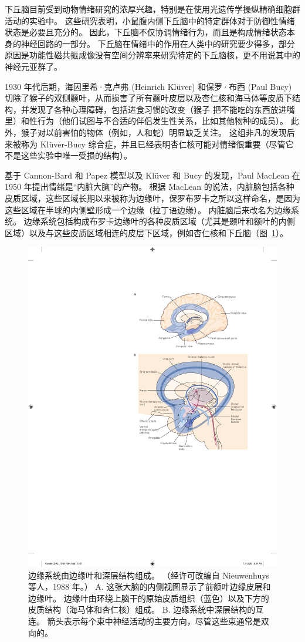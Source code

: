 下丘脑目前受到动物情绪研究的浓厚兴趣，特别是在使用光遗传学操纵精确细胞群活动的实验中。
这些研究表明，小鼠腹内侧下丘脑中的特定群体对于防御性情绪状态是必要且充分的。
因此，下丘脑不仅协调情绪行为，而且是构成情绪状态本身的神经回路的一部分。
下丘脑在情绪中的作用在人类中的研究要少得多，部分原因是功能性磁共振成像没有空间分辨率来研究特定的下丘脑核，更不用说其中的神经元亚群了。


1930 年代后期，海因里希·克卢弗 (Heinrich Klüver) 和保罗·布西 (Paul Bucy) 切除了猴子的双侧颞叶，从而损害了所有颞叶皮层以及杏仁核和海马体等皮质下结构，并发现了各种心理障碍，包括进食习惯的改变（猴子 把不能吃的东西放进嘴里）和性行为（他们试图与不合适的伴侣发生性关系，比如其他物种的成员）。
此外，猴子对以前害怕的物体（例如，人和蛇）明显缺乏关注。
这组非凡的发现后来被称为 Klüver-Bucy 综合症，并且已经表明杏仁核可能对情绪很重要（尽管它不是这些实验中唯一受损的结构）。


基于 Cannon-Bard 和 Papez 模型以及 Klüver 和 Bucy 的发现，Paul MacLean 在 1950 年提出情绪是“内脏大脑”的产物。
根据 MacLean 的说法，内脏脑包括各种皮质区域，这些区域长期以来被称为边缘叶，保罗布罗卡之所以这样命名，是因为这些区域在半球的内侧壁形成一个边缘（拉丁语边缘）。
内脏脑后来改名为边缘系统。 边缘系统包括构成布罗卡边缘叶的各种皮质区域（尤其是颞叶和额叶的内侧区域）以及与这些皮质区域相连的皮层下区域，例如杏仁核和下丘脑（图~\ref{fig:42_4}）。


\begin{figure}[htbp]
	\centering
	\includegraphics[width=0.6\linewidth]{chap42/fig_42_4}
	\caption{边缘系统由边缘叶和深层结构组成。 （经许可改编自 Nieuwenhuys 等人，1988 年。） A. 这张大脑的内侧视图显示了前额叶边缘皮层和边缘叶。 边缘叶由环绕上脑干的原始皮质组织（蓝色）以及下方的皮质结构（海马体和杏仁核）组成。 B. 边缘系统中深层结构的互连。 箭头表示每个束中神经活动的主要方向，尽管这些束通常是双向的。}
	\label{fig:42_4}
\end{figure}



